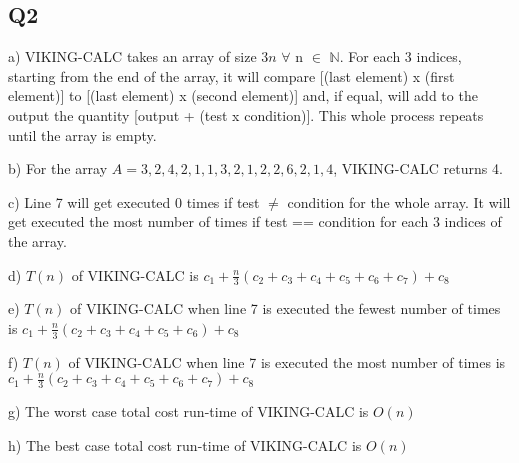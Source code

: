 \documentclass{article}
\begin{document}
\subsection{Q2}
a) VIKING-CALC takes an array of size $3n$ $\forall$ n $\in$  $\mathbb{N}$. For each 3 indices, starting from the end of the array, it will compare [(last element) x (first element)] to [(last element) x (second element)]  and, if equal, will add to the output the quantity [output + (test x condition)]. This whole process repeats until the array is empty.
\par
b) For the array $A={3,2,4,2,1,1,3,2,1,2,2,6,2,1,4}$, VIKING-CALC returns 4.
\par
c) Line 7 will get executed 0 times if test $\neq$ condition for the whole array. It will get executed the most number of times if test == condition for each 3 indices of the array.
\par
d) $T(n)$ of VIKING-CALC is $c_1 + \frac{n}{3} (c_2+ c_3 + c_4 + c_5 + c_6 + c_7) + c_8$
\par
e) $T(n)$ of VIKING-CALC when line 7 is executed the fewest number of times is
	$c_1 + \frac{n}{3} (c_2+ c_3 + c_4 + c_5 + c_6) + c_8$
\par
f) $T(n)$ of VIKING-CALC when line 7 is executed the most number of times is
	$c_1 + \frac{n}{3} (c_2+ c_3 + c_4 + c_5 + c_6 + c_7) + c_8$
\par
g) The worst case total cost run-time of VIKING-CALC is $O(n)$ 
\par
h) The best case total cost run-time of VIKING-CALC is $O(n)$ 
	
\end{document}
